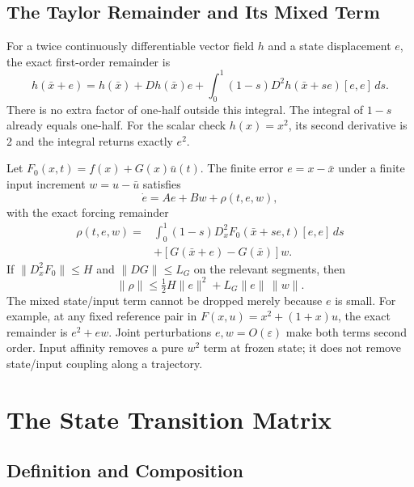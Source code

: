 \subsection{The Taylor Remainder and Its Mixed Term}

For a twice continuously differentiable vector field $h$ and a state displacement $e$, the exact first-order remainder is
\begin{equation}
h(\bar x+e)=h(\bar x)+Dh(\bar x)e+
\int_0^1(1-s)D^2h(\bar x+se)[e,e]\,ds.
\label{eq:ch2:f-taylor}
\end{equation}
There is no extra factor of one-half outside this integral. The integral of $1-s$ already equals one-half. For the scalar check $h(x)=x^2$, its second derivative is 2 and the integral returns exactly $e^2$.

Let $F_0(x,t)=f(x)+G(x)\bar u(t)$. The finite error $e=x-\bar x$ under a finite input increment $w=u-\bar u$ satisfies
\begin{equation}
\dot e=Ae+Bw+\rho(t,e,w),
\end{equation}
with the exact forcing remainder
\begin{equation}
\begin{split}
\rho(t,e,w)={}&\int_0^1(1-s)D_x^2F_0(\bar x+se,t)[e,e]\,ds\\
&+[G(\bar x+e)-G(\bar x)]w.
\end{split}
\label{eq:ch2:residual-hessian}
\end{equation}
If $\|D_x^2F_0\|\le H$ and $\|DG\|\le L_G$ on the relevant segments, then
\begin{equation}
\|\rho\|\le\tfrac12H\|e\|^2+L_G\|e\|\,\|w\|.
\end{equation}
The mixed state/input term cannot be dropped merely because $e$ is small. For example, at any fixed reference pair in $F(x,u)=x^2+(1+x)u$, the exact remainder is $e^2+ew$. Joint perturbations $e,w=O(\varepsilon)$ make both terms second order. Input affinity removes a pure $w^2$ term at frozen state; it does not remove state/input coupling along a trajectory.

\section{The State Transition Matrix}

\subsection{Definition and Composition}

